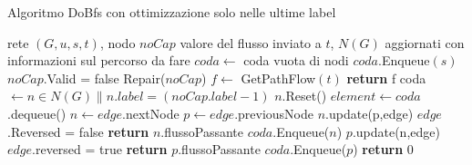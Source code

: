 \documentclass{article}
\begin{document}
\begin{algorithm}
    \caption{Algoritmo DoBfs con ottimizzazione solo nelle ultime label}
    \begin{algorithmic}
        \REQUIRE rete $(G,u,s,t)$, nodo $noCap$
        \ENSURE valore del flusso inviato a $t$, $N(G)$ aggiornati con informazioni sul percorso da fare
        \STATE $coda \leftarrow$ coda vuota di nodi
        \STATE $coda.$Enqueue$(s)$
        \ELSE
        \STATE $noCap$.Valid = false
        \STATE Repair($noCap$)
        \STATE $f \leftarrow $ GetPathFlow$(t)$
        \STATE \textbf{return} f
        \ENDIF
        \STATE coda $\leftarrow n \in N(G) \|  n.label = (noCap.label - 1)$
        \STATE $n$.Reset()
        \ENDFOR
        \ENDIF
        \STATE $element  \leftarrow coda$.dequeue()
         
        \STATE $n \leftarrow edge.$nextNode
        \STATE $p \leftarrow edge$.previousNode
        \STATE $n$.update(p,edge) 
        \STATE $edge$.Reversed = false 
        \STATE \textbf{return} $n$.flussoPassante
        \ELSE
        \STATE $coda$.Enqueue($n$)
        \ENDIF
        \STATE $p$.update(n,edge)
        \STATE $edge$.reversed = true
        \STATE \textbf{return} $p$.flussoPassante
        \ELSE
        \STATE $coda$.Enqueue($p$)
        \ENDIF
        \ENDIF
        \ENDFOR
        \ENDIF
        \ENDWHILE
        \STATE \textbf{return} 0
    \end{algorithmic}
\end{algorithm}
\end{document}
